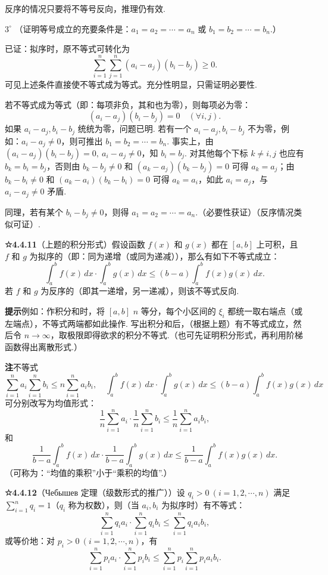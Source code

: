 \documentclass[UTF8,12pt,a4paper,fontset=fandol]{ctexart}
\begin{document}
反序的情况只要将不等号反向，推理仍有效.

$3^\circ$ （证明等号成立的充要条件是：$a_1=a_2=\cdots=a_n$ 或 $b_1=b_2=\cdots=b_n$.）

已证：拟序时，原不等式可转化为
\[
\sum_{i=1}^n\sum_{j=1}^n(a_i-a_j)(b_i-b_j)\ge0.
\]
可见上述条件直接使不等式成为等式。充分性明显，只需证明必要性.

若不等式成为等式（即：每项非负，其和也为零），则每项必为零：
\[
(a_i-a_j)(b_i-b_j)=0\quad(\forall i,j).
\]
如果 $a_i-a_j,b_i-b_j$ 统统为零，问题已明. 若有一个 $a_i-a_j,b_i-b_j$ 不为零，例如：$a_i-a_j\ne0$，则可推出 $b_1=b_2=\cdots=b_n$. 事实上，由 $(a_i-a_j)(b_i-b_j)=0,\ a_i-a_j\ne0$，知 $b_i=b_j$. 对其他每个下标 $k\ne i,j$ 也应有 $b_k=b_i=b_j$，否则由 $b_k-b_j\ne0$ 和 $(a_k-a_j)(b_k-b_j)=0$ 可得 $a_k=a_j$；由 $b_k-b_i\ne0$ 和 $(a_k-a_i)(b_k-b_i)=0$ 可得 $a_k=a_i$，如此 $a_i=a_j$，与 $a_i-a_j\ne0$ 矛盾.

同理，若有某个 $b_i-b_j\ne0$，则得 $a_1=a_2=\cdots=a_n$.（必要性获证）（反序情况类似可证）.

\noindent\textbf{☆4.4.11}\quad （上题的积分形式）假设函数 $f(x)$ 和 $g(x)$ 都在 $[a,b]$ 上可积，且 $f$ 和 $g$ 为拟序的（即：同为递增（或同为递减）），那么有如下不等式成立：
\[
\int_a^b f(x)\,dx\cdot\int_a^b g(x)\,dx
\le(b-a)\int_a^b f(x)g(x)\,dx.
\]
若 $f$ 和 $g$ 为反序的（即其一递增，另一递减），则该不等式反向.

\noindent\textbf{提示}\quad 例如：作积分和时，将 $[a,b]$ $n$ 等分，每个小区间的 $\xi_i$ 都统一取右端点（或左端点），不等式两端都如此操作. 写出积分和后，（根据上题）有不等式成立，然后令 $n\to\infty$，取极限即得欲求的积分不等式.（也可先证明积分形式，再利用阶梯函数得出离散形式.）

\noindent\textbf{注}\quad 不等式
\[
\sum_{i=1}^n a_i\sum_{i=1}^n b_i\le n\sum_{i=1}^n a_i b_i,\quad
\int_a^b f(x)\,dx\cdot\int_a^b g(x)\,dx
\le(b-a)\int_a^b f(x)g(x)\,dx
\]
可分别改写为均值形式：
\[
\frac1n\sum_{i=1}^n a_i\cdot\frac1n\sum_{i=1}^n b_i
\le\frac1n\sum_{i=1}^n a_i b_i,
\]
和
\[
\frac1{b-a}\int_a^b f(x)\,dx\cdot
\frac1{b-a}\int_a^b g(x)\,dx
\le\frac1{b-a}\int_a^b f(x)g(x)\,dx.
\]
（可称为：“均值的乘积”小于“乘积的均值”.）

\noindent\textbf{☆4.4.12}\quad （Чебышев 定理（级数形式的推广））设 $q_i>0\ (i=1,2,\cdots,n)$ 满足 $\sum_{i=1}^n q_i=1$（$q_i$ 称为权数），则（当 $a_i,b_i$ 为拟序时）有不等式：
\[
\sum_{i=1}^n q_i a_i\cdot\sum_{i=1}^n q_i b_i
\le\sum_{i=1}^n q_i a_i b_i, \tag{1}
\]
或等价地：对 $p_i>0\ (i=1,2,\cdots,n)$，有
\[
\sum_{i=1}^n p_i a_i\cdot\sum_{i=1}^n p_i b_i
\le\sum_{i=1}^n p_i\sum_{i=1}^n p_i a_i b_i. \tag{2}
\]
\end{document}
